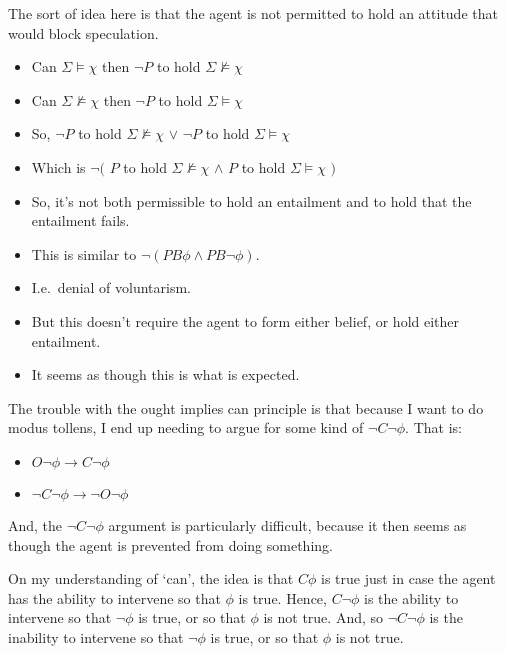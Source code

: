 \documentclass[10pt]{article}
\begin{document}
The sort of idea here is that the agent is not permitted to hold an attitude that would block speculation.

\begin{itemize}
\item Can \(\Sigma \vDash \chi\) then \(\lnot P\) to hold \(\Sigma \nvDash \chi\)
\item Can \(\Sigma \nvDash \chi\) then \(\lnot P\) to hold \(\Sigma \vDash \chi\)
\item So, \(\lnot P\) to hold \(\Sigma \nvDash \chi\) \(\lor\) \(\lnot P\) to hold \(\Sigma \vDash \chi\)
\item Which is \(\lnot (\) \(P\) to hold \(\Sigma \nvDash \chi\) \(\land\) \(P\) to hold \(\Sigma \vDash \chi\) \()\)
\item So, it's not both permissible to hold an entailment and to hold that the entailment fails.
\item This is similar to \(\lnot(PB\phi \land PB\lnot\phi)\).
\item I.e.\ denial of voluntarism.
\item But this doesn't require the agent to form either belief, or hold either entailment.
\end{itemize}

\begin{itemize}
\item It seems as though this is what is expected.
\end{itemize}


\newpage

The trouble with the ought implies can principle is that because I want to do modus tollens, I end up needing to argue for some kind of \(\lnot C \lnot \phi\).
That is:
\begin{itemize}
\item \(O\lnot\phi \rightarrow C\lnot\phi\)
\item \(\lnot C \lnot \phi \rightarrow \lnot O \lnot \phi\)
\end{itemize}
And, the \(\lnot C \lnot \phi\) argument is particularly difficult, because it then seems as though the agent is prevented from doing something.

On my understanding of `can', the idea is that \(C\phi\) is true just in case the agent has the ability to intervene so that \(\phi\) is true.
Hence, \(C \lnot\phi\) is the ability to intervene so that \(\lnot\phi\) is true, or so that \(\phi\) is not true.
And, so \(\lnot C \lnot \phi\) is the inability to intervene so that \(\lnot\phi\) is true, or so that \(\phi\) is not true.
\end{document}

